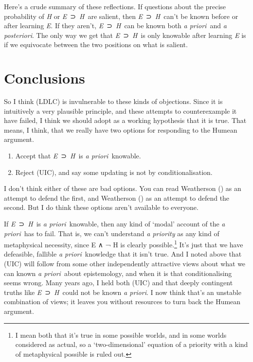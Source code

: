 \documentclass[
  11pt,
  letterpaper,
  DIV=11,
  numbers=noendperiod,
  twoside]{scrartcl}
\providecommand{\tightlist}{%
  \setlength{\itemsep}{0pt}\setlength{\parskip}{0pt}}
\begin{document}
Here's a crude summary of these reflections. If questions about the
precise probability of \emph{H} or \emph{E}~⊃~\emph{H}~are salient, then
\emph{E}~⊃~\emph{H}~can't be known before or after learning \emph{E}. If
they aren't, \emph{E}~⊃~\emph{H}~can be known both \emph{a priori}~and
\emph{a posteriori}. The only way we get that \emph{E}~⊃~\emph{H}~is
only knowable after learning \emph{E} is if we equivocate between the
two positions on what is salient.

\section{Conclusions}\label{conclusions}

So I think (LDLC) is invulnerable to these kinds of objections. Since it
is intuitively a very plausible principle, and these attempts to
counterexample it have failed, I think we should adopt as a working
hypothesis that it is true. That means, I think, that we really have two
options for responding to the Humean argument.

\begin{enumerate}
\def\labelenumi{\arabic{enumi}.}
\tightlist
\item
  Accept that \emph{E}~⊃~\emph{H}~is \emph{a priori}~knowable.
\item
  Reject (UIC), and say some updating is not by conditionalisation.
\end{enumerate}

I don't think either of these are bad options. You can read Weatherson
() as an attempt to defend the first,
and Weatherson () as an attempt to
defend the second. But I do think these options aren't available to
everyone.

If \emph{E}~⊃~\emph{H}~is \emph{a priori}~knowable, then any kind of
`modal' account of the \emph{a priori}~has to fail. That is, we can't
understand \emph{a priority} as any kind of metaphysical necessity,
since E ∧ ¬ H is clearly possible.\footnote{I mean both that it's true
  in some possible worlds, and in some worlds considered as actual, so a
  `two-dimensional' equation of a priority with a kind of metaphysical
  possible is ruled out.} It's just that we have defeasible, fallible
\emph{a priori}~knowledge that it isn't true. And I noted above that
(UIC) will follow from some other independently attractive views about
what we can known \emph{a priori}~about epistemology, and when it is
that conditionalising seems wrong. Many years ago, I held both (UIC) and
that deeply contingent truths like \emph{E}~⊃~\emph{H}~could not be
known \emph{a priori}. I now think that's an unstable combination of
views; it leaves you without resources to turn back the Humean argument.
\end{document}
